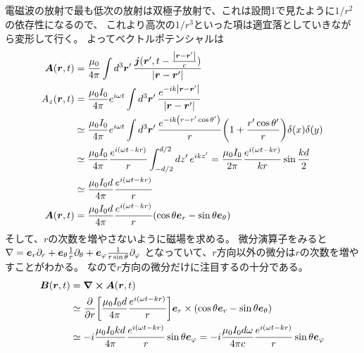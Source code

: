 \documentclass[../../sp_2017.tex]{subfiles}
\begin{document}
\subsection{}
電磁波の放射で最も低次の放射は双極子放射で、これは設問1で見たように\(1/r^2\)の依存性になるので、
これより高次の\(1/r^3\)といった項は適宜落としていきながら変形して行く。
よってベクトルポテンシャルは
\begin{equation}\begin{aligned}[b]
    \vb*{A}(\vb*{r},t) &= \frac{\mu_0}{4\pi}\int d^3\vb*{r}'\, \frac{\vb*{j}(\vb*{r}',t-\frac{\abs{\vb*{r}-\vb*{r}'}}{c})}{\abs{\vb*{r}-\vb*{r}'}}\\
    A_z(\vb*{r},t) &= \frac{\mu_0I_0}{4\pi}e^{i\omega t}\int d^3\vb*{r}'\,\frac{e^{-ik\abs{\vb*{r}-\vb*{r}'}}}{\abs{\vb*{r}-\vb*{r}'}}\\
    &\simeq \frac{\mu_0I_0}{4\pi}e^{i\omega t}\int d^3\vb*{r}'\,\frac{e^{-ik\qty(r-r'\cos\theta')}}{r}\qty(1+\frac{r'\cos\theta'}{r})\delta(x)\delta(y)\\
    &\simeq \frac{\mu_0I_0}{4\pi}\frac{e^{i(\omega t-kr)}}{r}\int_{-d/2}^{d/2}dz'\,e^{ikz'}
    = \frac{\mu_0I_0}{2\pi}\frac{e^{i(\omega t-kr)}}{kr}\sin\frac{kd}{2}\\
    &\simeq\frac{\mu_0I_0 d}{4\pi}\frac{e^{i(\omega t-kr)}}{r}\\
    \vb*{A}(\vb*{r},t)
    &= \frac{\mu_0I_0 d}{4\pi}\frac{e^{i(\omega t-kr)}}{r}\qty(\cos\theta \vb*{e}_r-\sin\theta \vb*{e}_\theta)
\end{aligned}\end{equation}
そして、\(r\)の次数を増やさないように磁場を求める。
微分演算子をみると\(\nabla = \vb*{e}_r\partial_r+\vb*{e}_\theta\frac{1}{r}\partial_\theta+\vb*{e}_\varphi\frac{1}{r\sin\theta}\partial_\varphi\)
となっていて、\(r\)方向以外の微分は\(r\)の次数を増やすことがわかる。
なので\(r\)方向の微分だけに注目するの十分である。
\begin{equation}\begin{aligned}[b]
    \vb*{B}(\vb*{r},t) &= \curl \vb*{A}(\vb*{r},t)\\
    &\simeq \pdv{r}\qty[\frac{\mu_0I_0 d}{4\pi}\frac{e^{i(\omega t-kr)}}{r}]\vb*{e}_r\times\qty(\cos\theta \vb*{e}_r-\sin\theta \vb*{e}_\theta)\\
    &\simeq -i\frac{\mu_0I_0 kd}{4\pi}\frac{e^{i(\omega t-kr)}}{r}\sin\theta \vb*{e}_\varphi
    = -i\frac{\mu_0I_0 d\omega}{4\pi c}\frac{e^{i(\omega t-kr)}}{r}\sin\theta \vb*{e}_\varphi
\end{aligned}\end{equation}
\end{document}
